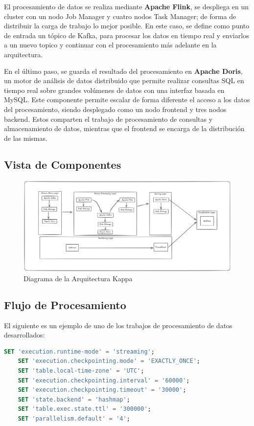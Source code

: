 El procesamiento de datos se realiza mediante \textbf{Apache Flink},
se despliega en un cluster con un nodo Job Manager y cuatro nodos Task Manager; de forma de distribuir la carga de trabajo lo mejor posible.
En este caso, se define como punto de entrada un tópico de Kafka, para procesar los datos en tiempo real y
enviarlos a un nuevo topico y continuar con el procesamiento más adelante en la arquitectura.

En el último paso, se guarda el resultado del procesamiento en \textbf{Apache Doris}, un motor de análisis de datos
distribuido que permite realizar consultas SQL en tiempo real sobre grandes volúmenes de datos con una interfaz basada en MySQL.
Este componente permite escalar de forma diferente el acceso a los datos del procesamiento, 
siendo desplegado como un nodo frontend y tres nodos backend. 
Estos comparten el trabajo de procesamiento de consultas y almacenamiento de datos, 
mientras que el frontend se encarga de la distribución de las mismas. 

\newpage
\subsection{Vista de Componentes}

\begin{figure}[h]
\centering
\includegraphics[width=1\textwidth]{desarrollo/Kappa.png}
\caption{Diagrama de la Arquitectura Kappa}
\label{fig:des_arquitectura_kappa}
\end{figure}

\newpage

\subsection{Flujo de Procesamiento}

El siguiente es un ejemplo de uno de los trabajos de procesamiento de datos desarrollados:

\begin{lstlisting}[language=sql]
    SET 'execution.runtime-mode' = 'streaming';
    SET 'execution.checkpointing.mode' = 'EXACTLY_ONCE';
    SET 'table.local-time-zone' = 'UTC';
    SET 'execution.checkpointing.interval' = '60000';
    SET 'execution.checkpointing.timeout' = '30000';
    SET 'state.backend' = 'hashmap';
    SET 'table.exec.state.ttl' = '300000';
    SET 'parallelism.default' = '4';
\end{lstlisting}

